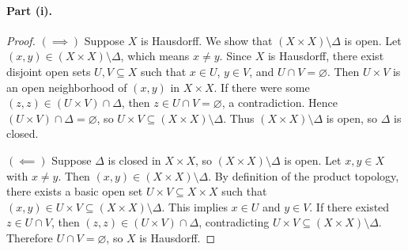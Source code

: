 
\paragraph{Part (i).}
\begin{proof}
$(\implies)$ Suppose $X$ is Hausdorff. We show that $(X\times X)\setminus\Delta$ is open.
Let $(x,y)\in(X\times X)\setminus\Delta$, which means $x\neq y$. Since $X$ is Hausdorff, there
exist disjoint open sets $U,V\subseteq X$ such that $x\in U$, $y\in V$, and
$U\cap V=\varnothing$. Then $U\times V$ is an open neighborhood of $(x,y)$ in $X\times X$. If
there were some $(z,z)\in(U\times V)\cap\Delta$, then $z\in U\cap V=\varnothing$, a
contradiction. Hence $(U\times V)\cap\Delta=\varnothing$, so
$U\times V\subseteq(X\times X)\setminus\Delta$. Thus $(X\times X)\setminus\Delta$ is open, so
$\Delta$ is closed.

\smallskip
$(\impliedby)$ Suppose $\Delta$ is closed in $X\times X$, so $(X\times X)\setminus\Delta$ is
open. Let $x,y\in X$ with $x\neq y$. Then $(x,y)\in(X\times X)\setminus\Delta$. By definition of
the product topology, there exists a basic open set $U\times V\subseteq X\times X$ such that
$(x,y)\in U\times V\subseteq(X\times X)\setminus\Delta$. This implies $x\in U$ and $y\in V$. If
there existed $z\in U\cap V$, then $(z,z)\in(U\times V)\cap\Delta$, contradicting
$U\times V\subseteq(X\times X)\setminus\Delta$. Therefore $U\cap V=\varnothing$, so $X$ is
Hausdorff.
\end{proof}

